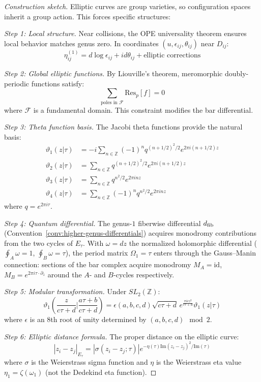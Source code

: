 \begin{proof}[Construction sketch]
Elliptic curves are group varieties, so configuration spaces inherit a group action. This forces specific structures:

\emph{Step 1: Local structure.} Near collisions, the OPE universality theorem ensures local behavior matches genus zero. In coordinates $(u, \epsilon_{ij}, \theta_{ij})$ near $D_{ij}$:
\[\eta_{ij}^{(1)} = d\log\epsilon_{ij} + id\theta_{ij} + \text{elliptic corrections}\]

\emph{Step 2: Global elliptic functions.} By Liouville's theorem, meromorphic doubly-periodic functions satisfy:
\[\sum_{\text{poles in } \mathcal{F}} \text{Res}_p[f] = 0\]
where $\mathcal{F}$ is a fundamental domain. This constraint modifies the bar differential.

\emph{Step 3: Theta function basis.} The Jacobi theta functions provide the natural basis:
\begin{align}
\vartheta_1(z|\tau) &= -i\sum_{n \in \mathbb{Z}}(-1)^n q^{(n+1/2)^2/2} e^{2\pi i(n+1/2)z} \\
\vartheta_2(z|\tau) &= \sum_{n \in \mathbb{Z}} q^{(n+1/2)^2/2} e^{2\pi i(n+1/2)z} \\
\vartheta_3(z|\tau) &= \sum_{n \in \mathbb{Z}} q^{n^2/2} e^{2\pi inz} \\
\vartheta_4(z|\tau) &= \sum_{n \in \mathbb{Z}}(-1)^n q^{n^2/2} e^{2\pi inz}
\end{align}
where $q = e^{2\pi i\tau}$.

\emph{Step 4: Quantum differential.} The genus-$1$ fiberwise differential $d_{\mathrm{fib}}$ (Convention~\ref{conv:higher-genus-differentials}) acquires monodromy contributions from the two cycles of $E_\tau$. With $\omega = dz$ the normalized holomorphic differential ($\oint_A \omega = 1$, $\oint_B \omega = \tau$), the period matrix $\Omega_1 = \tau$ enters through the Gauss--Manin connection: sections of the bar complex acquire monodromy $M_A = \mathrm{id}$, $M_B = e^{2\pi i \tau \cdot \partial_z}$ around the $A$- and $B$-cycles respectively.

\emph{Step 5: Modular transformation.} Under $SL_2(\mathbb{Z})$:
\[\vartheta_1\left(\frac{z}{c\tau+d}\bigg|\frac{a\tau+b}{c\tau+d}\right) = \epsilon(a,b,c,d)\sqrt{c\tau+d}\,e^{\frac{\pi i cz^2}{c\tau+d}}\vartheta_1(z|\tau)\]
where $\epsilon$ is an 8th root of unity determined by $(a,b,c,d) \mod 2$.

\emph{Step 6: Elliptic distance formula.} The proper distance on the elliptic curve:
\[|z_i - z_j|_{E_\tau} = |\sigma(z_i - z_j; \tau)|e^{-\eta(\tau)\text{Im}(z_i - z_j)^2/\text{Im}(\tau)}\]
where $\sigma$ is the Weierstrass sigma function and $\eta$ is the Weierstrass eta value $\eta_1 = \zeta(\omega_1)$ (not the Dedekind eta function).
\end{proof}

